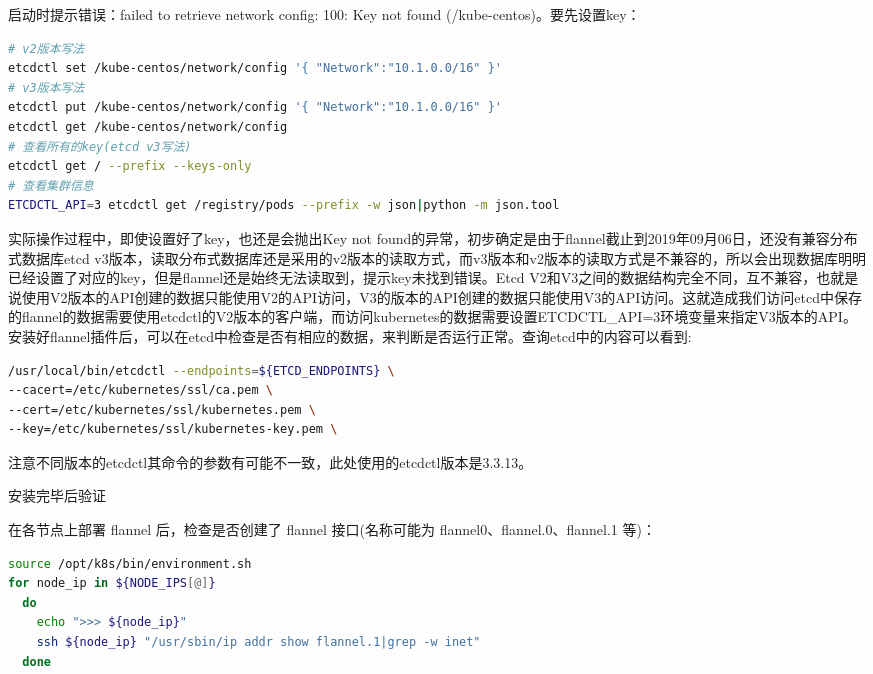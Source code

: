 \documentclass[8pt]{book}
\makeatletter
\numberwithin{dummy}{section}
\theoremstyle{ocrenumbox}
\theoremstyle{blacknumex}
\theoremstyle{blacknumbox}
\theoremstyle{ocrenum}
\renewcommand\paragraph{\@startsection{paragraph}{4}{\z@}
	{-2ex \@plus-.2ex \@minus .2ex}
	{.1ex}
	{\normalfont\small\sffamily\bfseries}}
\makeatother
\begin{document}
启动时提示错误：failed to retrieve network config: 100: Key not found (/kube-centos)。要先设置key：

\begin{lstlisting}[language=Bash]
# v2版本写法
etcdctl set /kube-centos/network/config '{ "Network":"10.1.0.0/16" }'
# v3版本写法
etcdctl put /kube-centos/network/config '{ "Network":"10.1.0.0/16" }'
etcdctl get /kube-centos/network/config
# 查看所有的key(etcd v3写法)
etcdctl get / --prefix --keys-only
# 查看集群信息
ETCDCTL_API=3 etcdctl get /registry/pods --prefix -w json|python -m json.tool
\end{lstlisting}

实际操作过程中，即使设置好了key，也还是会抛出Key not found的异常，初步确定是由于flannel截止到2019年09月06日，还没有兼容分布式数据库etcd v3版本，读取分布式数据库还是采用的v2版本的读取方式，而v3版本和v2版本的读取方式是不兼容的，所以会出现数据库明明已经设置了对应的key，但是flannel还是始终无法读取到，提示key未找到错误。Etcd V2和V3之间的数据结构完全不同，互不兼容，也就是说使用V2版本的API创建的数据只能使用V2的API访问，V3的版本的API创建的数据只能使用V3的API访问。这就造成我们访问etcd中保存的flannel的数据需要使用etcdctl的V2版本的客户端，而访问kubernetes的数据需要设置ETCDCTL\_API=3环境变量来指定V3版本的API。安装好flannel插件后，可以在etcd中检查是否有相应的数据，来判断是否运行正常。查询etcd中的内容可以看到:

\begin{lstlisting}[language=Bash]
/usr/local/bin/etcdctl --endpoints=${ETCD_ENDPOINTS} \
--cacert=/etc/kubernetes/ssl/ca.pem \
--cert=/etc/kubernetes/ssl/kubernetes.pem \
--key=/etc/kubernetes/ssl/kubernetes-key.pem \
\end{lstlisting}

注意不同版本的etcdctl其命令的参数有可能不一致，此处使用的etcdctl版本是3.3.13。

\paragraph{安装完毕后验证}

在各节点上部署 flannel 后，检查是否创建了 flannel 接口(名称可能为 flannel0、flannel.0、flannel.1 等)：

\begin{lstlisting}[language=Bash]
source /opt/k8s/bin/environment.sh
for node_ip in ${NODE_IPS[@]}
  do
    echo ">>> ${node_ip}"
    ssh ${node_ip} "/usr/sbin/ip addr show flannel.1|grep -w inet"
  done
\end{lstlisting}
\end{document}
